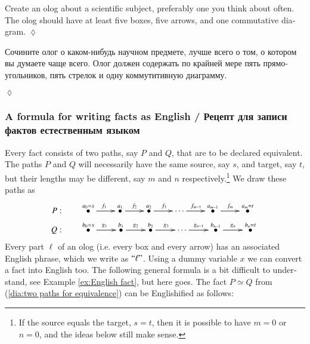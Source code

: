 \documentclass[a4paper]{book}
\def\tn{\textnormal}
\newcommand{\qtE}[1]{\tn{“}#1\tn{”}}
\def\hsp{\hspace{.3in}}
\newcommand{\LMO}[1]{\stackrel{#1}{\bullet}}
\theoremstyle{myth}
\newtheorem{excENG}[envENG]{\begin{english}Exercise\end{english}}
\newenvironment{exerciseENG}{\begin{excENG}}{\hspace*{\fill}$\lozenge$\end{excENG}}
\newtheorem{excRUS}[envRUS]{\begin{russian}Упражнение\end{russian}}
\newenvironment{exerciseRUS}{\begin{excRUS}}{\hspace*{\fill}$\lozenge$\end{excRUS}}
\begin{document}
\begin{english}
\begin{exerciseENG}
Create an olog about a scientific subject, preferably one you think about often. The olog should have at least five boxes, five arrows, and one commutative diagram. 
\end{exerciseENG}

\begin{exerciseRUS}
\begin{russian}Сочините олог о каком-нибудь научном предмете, лучше всего о том, о котором вы думаете чаще всего. Олог должен содержать по крайней мере пять прямоугольников, пять стрелок и одну коммутитивную диаграмму. \end{russian}
\end{exerciseRUS}


\subsubsection{A formula for writing facts as English / Рецепт для записи фактов естественным языком}

Every fact consists of two paths, say $P$ and $Q$, that are to be declared equivalent. The paths $P$ and $Q$ will necessarily have the same source, say $s$, and target, say $t$, but their lengths may be different, say $m$ and $n$ respectively.\footnote{If the source equals the target, $s=t$, then it is possible  to have $m=0$ or $n=0$, and the ideas below still make sense.} 
We draw these paths as 
\begin{align}\label{dia:two paths for equivalence}
P:&\hsp\xymatrix@=22pt{\LMO{a_0=s}\ar[r]^{f_1}&\LMO{a_1}\ar[r]^{f_2}&\LMO{a_2}\ar[r]^{f_3}&\cdots\ar[r]^{f_{m-1}}&\LMO{a_{m-1}}\ar[r]^{f_m}&\LMO{a_m=t}}\\\nonumber
Q:&\hsp\xymatrix@=23pt{\LMO{b_0=s}\ar[r]^{g_1}&\LMO{b_1}\ar[r]^{g_2}&\LMO{b_2}\ar[r]^{g_3}&\cdots\ar[r]^{g_{n-1}}&\LMO{b_{n-1}}\ar[r]^{g_n}&\LMO{b_n=t}}
\end{align}
Every part $\ell$ of an olog (i.e. every box and every arrow) has an associated English phrase, which we write as $\qtE{\ell}$. Using a dummy variable $x$ we can convert a fact into English too. The following general formula is a bit difficult to understand, see Example \ref{ex:English fact}, but here goes. The fact $P\simeq Q$ from (\ref{dia:two paths for equivalence}) can be Englishified as follows:


\end{english}
\end{document}
